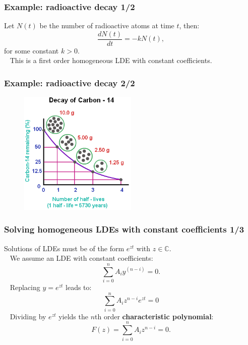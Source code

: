 \begin{frame}
\frametitle{Example: radioactive decay 1/2}
Let $N(t)$ be the number of radioactive atoms at time $t$, then:
\begin{equation*}
\frac{dN(t)}{dt} = - k N(t),
\end{equation*}
for some constant $k>0$. \\ \pause
\ \newline
This is a first order homogeneous LDE with constant coefficients.
\end{frame}

\begin{frame}
\frametitle{Example: radioactive decay 2/2}
\begin{figure}
\includegraphics[width=0.5\textwidth]{decay-of-carbon-14.png}
\end{figure}
\end{frame}

\begin{frame}
\frametitle{Solving homogeneous LDEs with constant coefficients 1/3}
Solutions of LDEs must be of the form $e^{zt}$ with $z \in \mathbb{C}$. \\
\pause
\ \newline
We assume an LDE with constant coefficients:
\begin{equation*}
\sum_{i=0}^n A_i y^{(n-i)} = 0.
\end{equation*}
\ \pause
Replacing $y = e^{zt}$ leads to:
\begin{equation*}
\sum_{i=0}^n A_i z^{n-i} e^{zt} = 0
\end{equation*}
\ \pause
Dividing by $e^{zt}$ yields the $n$th order \textbf{characteristic polynomial}:
\begin{equation*}
F(z) = \sum_{i=0}^n A_i z^{n-i} = 0.
\end{equation*}
\end{frame}

